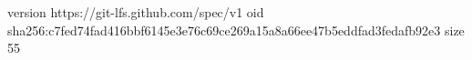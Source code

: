 version https://git-lfs.github.com/spec/v1
oid sha256:c7fed74fad416bbf6145e3e76c69ce269a15a8a66ee47b5eddfad3fedafb92e3
size 55
